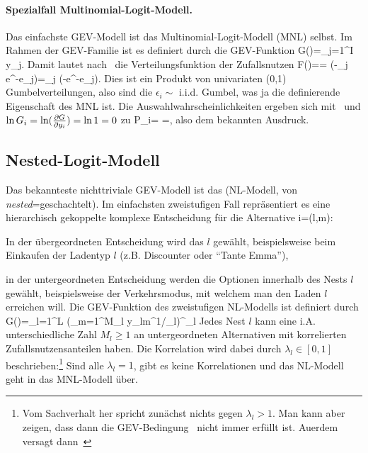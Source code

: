 \paragraph{Spezialfall Multinomial-Logit-Modell.} Das einfachste
GEV-Modell ist das Multinomial-Logit-Modell (MNL) selbst. 
Im Rahmen der GEV-Familie ist es definiert durch die GEV-Funktion
\be
\label{G-MNL}
G()=\sum_{j=1}^{I} y_j.
\ee 
Damit lautet nach~ die Verteilungsfunktion der
Zufallsnutzen
\bdm
F()=\exp{}
 = \exp\left(-\sum_j e^{-e_j}\right)=\prod_j \exp
 \left(-e^{-e_j}\right).
\edm
Dies ist ein Produkt von univariaten (0,1) Gumbelverteilungen, also
sind die $\epsilon_i \sim $ i.i.d. Gumbel, was ja die definierende
Eigenschaft des MNL ist. Die Auswahlwahrscheinlichkeiten ergeben sich
mit~ und $\ln G_i=\ln(\frac{\partial G}{\partial y_i})=\ln 1=0$ zu
\bdm
P_i=
 =,
\edm
also dem bekannten Ausdruck.


\subsection{\label{sec:nestedLogit}Nested-Logit-Modell}

Das bekannteste nichttriviale GEV-Modell ist das 
(NL-Modell, von \emph{nested}=geschachtelt). Im einfachsten
zweistufigen Fall repr\"asentiert es eine hierarchisch
gekoppelte komplexe Entscheidung f\"ur die Alternative
\be
\label{nestedLogit-i}
i=(l,m):
\ee
\bi
\item In der \"ubergeordneten Entscheidung wird das  $l$ gew\"ahlt, beispielsweise beim
  Einkaufen der Ladentyp $l$ (z.B. Discounter oder ``Tante Emma''),
\item in der untergeordneten Entscheidung werden die Optionen
  innerhalb des Nests $l$ gew\"ahlt, beispielsweise der Verkehrsmodus,
  mit welchem man den Laden $l$ erreichen will.
\ei
Die GEV-Funktion des zweistufigen NL-Modells ist definiert
durch
\be
\label{NL-G}
G()=\sum_{l=1}^L 
 \left(\sum_{m=1}^{M_l} y_{lm}^{1/\lambda_l}\right)^{\lambda_l}
\ee
Jedes Nest $l$ kann eine i.A. unterschiedliche Zahl $M_l\ge 1$ an
untergeordneten Alternativen mit korrelierten Zufallsnutzensanteilen
haben. Die Korrelation wird dabei durch $\lambda_l \in [0,1]$
beschrieben:\footnote{Vom Sachverhalt her spricht zun\"achst nichts
  gegen $\lambda_l>1$. Man kann aber zeigen, dass dann die
  GEV-Bedingung~ nicht immer erf\"ullt ist. Au\3erdem
  versagt dann~} 
 Sind alle $\lambda_l=1$, gibt
 es keine Korrelationen und das NL-Modell geht in das MNL-Modell
 \"uber.

